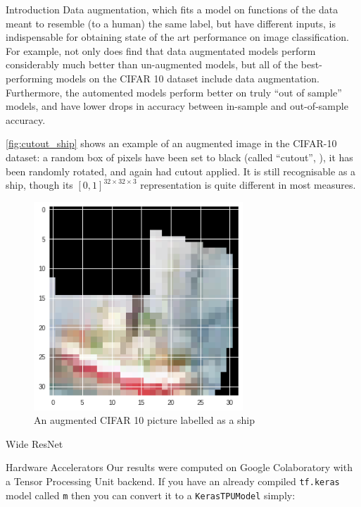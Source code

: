 \documentclass[final]{beamer}
\newlength{\onecolwid}
\begin{document}
\begin{frame}[t]
\begin{columns}[t]
\begin{column}{\onecolwid}
\begin{block}{Introduction}
Data augmentation, which fits a model on functions of the data meant to resemble (to a human) the same label, but have different inputs, is indispensable for obtaining state of the art performance on image classification. For example, not only does \cite{Recht2018} find that data augmentated models perform considerably much better than un-augmented models, but all of the best-performing models on the CIFAR 10 dataset include data augmentation. Furthermore, the automented models perform better on truly ``out of sample'' models, and have lower drops in accuracy between in-sample and out-of-sample accuracy.

\autoref{fig:cutout_ship} shows an example of an augmented image in the CIFAR-10 dataset: a random box of pixels have been set to black (called ``cutout'', \cite{Devries2017}), it has been randomly rotated, and again had cutout applied. It is still recognisable as a ship, though its $[0, 1]^{32 \times 32 \times 3}$ representation is quite different in most measures.

\begin{figure}
\centering
\includegraphics[width=0.70\textwidth]{ship.png}
\caption{An augmented CIFAR 10 picture labelled as a ship}
\label{fig:cutout_ship}
\end{figure}
\end{block}

\begin{block}{Wide ResNet}
\cite{Zagoruyko2016}

\end{block}

\begin{block}{Hardware Accelerators}
Our results were computed on Google Colaboratory with a Tensor Processing Unit backend.
If you have an already compiled \texttt{tf.keras} model called \texttt{m} then you can convert it to a \texttt{KerasTPUModel} simply:


\end{block}
\end{column}
\end{columns}
\end{frame}
\end{document}
